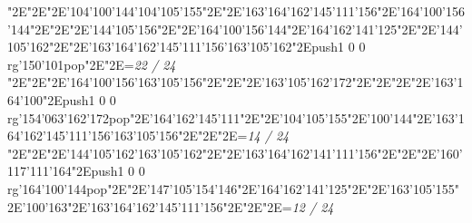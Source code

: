 \null\vfill\enskip\enskip\enskip\ipa\char"2E\enskip\enskip\enskip\ipa\char"2E\enskip\ipa\char"2E\ipa\char'104\ipa\char'100\ipa\char'144\bigskip\ipa\char'104\ipa\char'105\ipa\char'155\ipa\char"2E\enskip\enskip\enskip\ipa\char"2E\ipa\char'163\ipa\char'164\ipa\char'162\ipa\char'145\ipa\char'111\ipa\char'156\bigskip\enskip\enskip\ipa\char"2E\ipa\char'164\ipa\char'100\ipa\char'156\ipa\char'144\ipa\char"2E\enskip\ipa\char"2E\enskip\enskip\enskip\enskip\ipa\char"2E\ipa\char'144\ipa\char'105\ipa\char'156\ipa\char"2E\enskip\enskip\enskip\ipa\char"2E\ipa\char'164\ipa\char'100\ipa\char'156\ipa\char'144\bigskip\enskip\ipa\char"2E\ipa\char'164\ipa\char'162\ipa\char'141\ipa\char'125\ipa\char"2E\enskip\enskip\ipa\char"2E\ipa\char'144\ipa\char'105\ipa\char'162\ipa\char"2E\enskip\enskip\ipa\char"2E\ipa\char'163\ipa\char'164\ipa\char'162\ipa\char'145\ipa\char'111\ipa\char'156\bigskip\ipa\char'163\ipa\char'105\ipa\char'162\ipa\char"2E\pdfcolorstack\match push{1 0 0 rg}\ipa\char'150\ipa\char'101\pdfcolorstack\match pop{}\ipa\char"2E\enskip\enskip\enskip\ipa\char"2E\enskip\enskip\enskip\bigskip\vfill\footline={\hfill\tenrm\it 22 / 24}\eject
\null\vfill\enskip\enskip\enskip\ipa\char"2E\enskip\enskip\enskip\ipa\char"2E\enskip\ipa\char"2E\ipa\char'164\ipa\char'100\ipa\char'156\bigskip\ipa\char'163\ipa\char'105\ipa\char'156\ipa\char"2E\enskip\enskip\enskip\ipa\char"2E\enskip\enskip\enskip\enskip\enskip\enskip\bigskip\enskip\enskip\ipa\char"2E\ipa\char'163\ipa\char'105\ipa\char'162\ipa\char'172\ipa\char"2E\enskip\ipa\char"2E\enskip\enskip\enskip\enskip\ipa\char"2E\enskip\enskip\enskip\ipa\char"2E\ipa\char'163\ipa\char'164\ipa\char'100\ipa\char"2E\pdfcolorstack\match push{1 0 0 rg}\ipa\char'154\ipa\char'063\ipa\char'162\ipa\char'172\pdfcolorstack\match pop{}\bigskip\enskip\ipa\char"2E\ipa\char'164\ipa\char'162\ipa\char'145\ipa\char'111\ipa\char"2E\enskip\enskip\ipa\char"2E\ipa\char'104\ipa\char'105\ipa\char'155\ipa\char"2E\ipa\char'100\ipa\char'144\ipa\char"2E\ipa\char'163\ipa\char'164\ipa\char'162\ipa\char'145\ipa\char'111\ipa\char'156\bigskip\ipa\char'163\ipa\char'105\ipa\char'156\ipa\char"2E\enskip\enskip\ipa\char"2E\enskip\enskip\enskip\ipa\char"2E\enskip\enskip\enskip\bigskip\vfill\footline={\hfill\tenrm\it 14 / 24}\eject
\null\vfill\enskip\enskip\enskip\ipa\char"2E\enskip\enskip\enskip\ipa\char"2E\enskip\ipa\char"2E\ipa\char'144\ipa\char'105\ipa\char'162\bigskip\ipa\char'163\ipa\char'105\ipa\char'162\ipa\char"2E\enskip\enskip\enskip\ipa\char"2E\ipa\char'163\ipa\char'164\ipa\char'162\ipa\char'141\ipa\char'111\ipa\char'156\bigskip\enskip\enskip\ipa\char"2E\enskip\enskip\enskip\enskip\ipa\char"2E\enskip\ipa\char"2E\ipa\char'160\ipa\char'117\ipa\char'111\ipa\char'164\ipa\char"2E\pdfcolorstack\match push{1 0 0 rg}\ipa\char'164\ipa\char'100\ipa\char'144\pdfcolorstack\match pop{}\ipa\char"2E\enskip\enskip\enskip\ipa\char"2E\ipa\char'147\ipa\char'105\ipa\char'154\ipa\char'146\bigskip\enskip\ipa\char"2E\ipa\char'164\ipa\char'162\ipa\char'141\ipa\char'125\ipa\char"2E\enskip\enskip\ipa\char"2E\ipa\char'163\ipa\char'105\ipa\char'155\ipa\char"2E\ipa\char'100\ipa\char'163\ipa\char"2E\ipa\char'163\ipa\char'164\ipa\char'162\ipa\char'145\ipa\char'111\ipa\char'156\bigskip\enskip\enskip\enskip\ipa\char"2E\enskip\enskip\ipa\char"2E\enskip\enskip\enskip\ipa\char"2E\enskip\enskip\enskip\bigskip\vfill\footline={\hfill\tenrm\it 12 / 24}\eject
